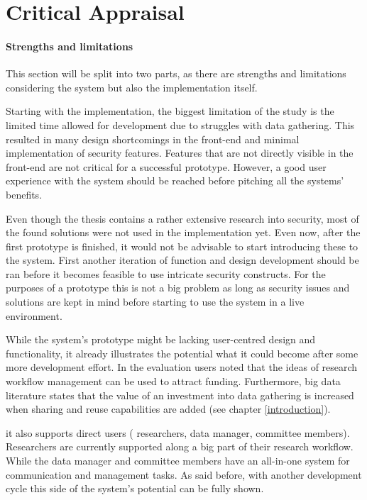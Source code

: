 \section{Critical Appraisal}

\paragraph{Strengths and limitations}
This section will be split into two parts, as there are strengths and limitations considering the system but also the implementation itself.

Starting with the implementation, the biggest limitation of the study is the limited time allowed for development due to struggles with data gathering.
This resulted in many design shortcomings in the front-end and minimal implementation of security features.
Features that are not directly visible in the front-end are not critical for a successful prototype.
However, a good user experience with the system should be reached before pitching all the systems' benefits.

Even though the thesis contains a rather extensive research into security, most of the found solutions were not used in the \ivfsystem{}implementation yet.
Even now, after the first prototype is finished, it would not be advisable to start introducing these to the system.
First another iteration of function and design development should be ran before it becomes feasible to use intricate security constructs.
For the purposes of a prototype this is not a big problem as long as security issues and solutions are kept in mind before starting to use the system in a live environment.

While the system's prototype might be lacking user-centred design and functionality, it already illustrates the potential what it could become after some more development effort.
In the evaluation users noted that the ideas of research workflow management can be used to attract funding.
Furthermore, big data literature states that the value of an investment into data gathering is increased when sharing and reuse capabilities are added (see chapter \ref{introduction}).




 it also supports direct users (\ie{} researchers, data manager, committee members).
Researchers are currently supported along a big part of their research workflow.
While the data manager and committee members have an all-in-one system for communication and management tasks.
As said before, with another development cycle this side of the system's potential can be fully shown.

